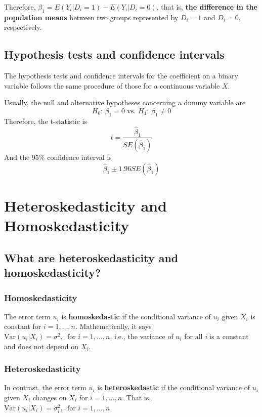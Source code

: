 \documentclass[a4paper,11pt]{article}
\newcommand{\var}{\mathrm{Var}}
\begin{document}
Therefore, \(\beta_1 = E(Y_i | D_i = 1) - E(Y_i |D_i = 0)\), that is,
\textbf{the difference in the population means} between two groups represented by
\(D_i = 1\) and \(D_i = 0\), respectively.


\subsection{Hypothesis tests and confidence intervals}
\label{sec:orga4ab873}

The hypothesis tests and confidence intervals for the coefficient on a
binary variable follows the same procedure of those for a continuous
variable \(X\). 

Usually, the null and alternative hypotheses concerning a dummy variable are
\[ H_0:\, \beta_1 = 0 \text{ vs. } H_1:\, \beta_1 \neq 0 \]
Therefore, the t-statistic is 
\[ t = \frac{\hat{\beta}_1}{SE(\hat{\beta}_1)} \]
And the 95\% confidence interval is
\[ \hat{\beta}_1 \pm 1.96 SE(\hat{\beta}_1) \]


\section{Heteroskedasticity and Homoskedasticity}
\label{sec:orga06e261}

\subsection{What are heteroskedasticity and homoskedasticity?}
\label{sec:orgfdd948d}

\subsubsection*{Homoskedasticity}
\label{sec:orgb42775d}

The error term \(u_i\) is \textbf{homoskedastic} if the conditional variance of
\(u_i\) given \(X_i\) is constant for \(i = 1, \ldots, n\). Mathematically,
it says \(\var(u_i | X_i) = \sigma^2,\, \text{ for } i = 1, \ldots, n\),
i.e., the variance of \(u_i\) for all \emph{i} is a constant and does not
depend on \(X_i\).

\subsubsection*{Heteroskedasticity}
\label{sec:orgccb6b65}
In contrast, the error term \(u_i\) is \textbf{heteroskedastic} if the conditional variance of
\(u_i\) given \(X_i\) changes on \(X_i\) for \(i = 1, \ldots, n\). That is,
\(\var(u_i | X_i) = \sigma^2_i,\, \text{ for } i = 1, \ldots, n\). 
\end{document}
